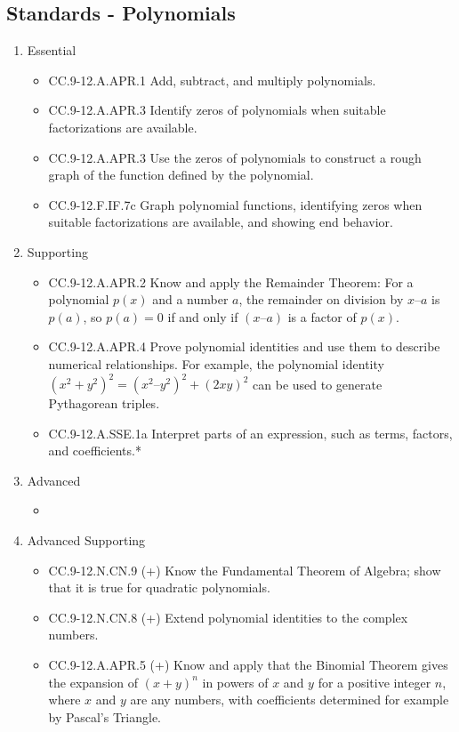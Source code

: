 \documentclass{article}
\begin{document}
\subsection*{Standards - Polynomials}
\begin{enumerate}
	\item Essential
	\begin{itemize}
		\item CC.9-12.A.APR.1  Add, subtract, and multiply polynomials.
		\item CC.9-12.A.APR.3  Identify zeros of polynomials when suitable factorizations are available.
		\item CC.9-12.A.APR.3  Use the zeros of polynomials to construct a rough graph of the function defined by the polynomial.
		\item CC.9-12.F.IF.7c Graph polynomial functions, identifying zeros when suitable factorizations are available, and showing end behavior.
	\end{itemize}		
	\item Supporting
	\begin{itemize}
		\item CC.9-12.A.APR.2 Know and apply the Remainder Theorem: For a polynomial $p(x)$ and a number $a$, the remainder on division by $x – a$ is $p(a)$, so $p(a) = 0$ if and only if $(x – a)$ is a factor of $p(x)$.
		\item CC.9-12.A.APR.4  Prove polynomial identities and use them to describe numerical relationships. For example, the polynomial identity $(x^2 + y^2)^2 = (x^2 – y^2)^2 + (2xy)^2$ can be used to generate Pythagorean triples.
		\item CC.9-12.A.SSE.1a Interpret parts of an expression, such as terms, factors, and coefficients.*
	\end{itemize}
	\item Advanced
	\begin{itemize}
		\item
	\end{itemize}
	\item Advanced Supporting
	\begin{itemize}
		\item CC.9-12.N.CN.9 (+)  Know the Fundamental Theorem of Algebra; show that it is true for quadratic polynomials.
		\item CC.9-12.N.CN.8 (+)  Extend polynomial identities to the complex numbers.		
		\item CC.9-12.A.APR.5 (+) Know and apply that the Binomial Theorem gives the expansion of $(x + y)^n$ in powers of $x$ and $y$ for a positive integer $n$, where $x$ and $y$ are any numbers, with coefficients determined for example by Pascal’s Triangle. 
	\end{itemize}
\end{enumerate}
\newpage
\end{document}
